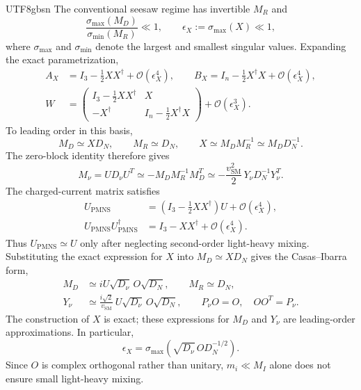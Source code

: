 \documentclass[11pt,a4paper,oneside]{report}
\begin{document}
\begin{CJK*}{UTF8}{gbsn}
The conventional seesaw regime has invertible $M_R$ and
\begin{equation*}
\frac{\sigma_{\max}(M_D)}{\sigma_{\min}(M_R)}\ll1,\qquad
\epsilon_X:=\sigma_{\max}(X)\ll1,
\tag{6.35}\label{eq:6.35}
\end{equation*}
where $\sigma_{\max}$ and $\sigma_{\min}$ denote the largest and smallest singular values. Expanding the exact parametrization,
\begin{equation*}
\begin{aligned}
A_X&=I_3-\frac12XX^\dagger+\mathcal O(\epsilon_X^4),\qquad
B_X=I_n-\frac12X^\dagger X+\mathcal O(\epsilon_X^4),\\
W&=\begin{pmatrix}I_3-\frac12XX^\dagger&X\\-X^\dagger&I_n-\frac12X^\dagger X\end{pmatrix}
+\mathcal O(\epsilon_X^3).
\end{aligned}
\tag{6.36}\label{eq:6.36}
\end{equation*}
To leading order in this basis,
\begin{equation*}
M_D\simeq XD_N,\qquad M_R\simeq D_N,\qquad
X\simeq M_DM_R^{-1}\simeq M_DD_N^{-1}.
\tag{6.37}\label{eq:6.37}
\end{equation*}
The zero-block identity therefore gives
\begin{equation*}
{\displaystyle M_\nu=UD_\nu U^T\simeq-M_DM_R^{-1}M_D^T
\simeq-\frac{v_{\mathrm{SM}}^2}{2}\,Y_\nu D_N^{-1}Y_\nu^T}.
\tag{6.38}\label{eq:6.38}
\end{equation*}
The charged-current matrix satisfies
\begin{equation*}
\begin{aligned}
U_{\mathrm{PMNS}}&=\left(I_3-\frac12XX^\dagger\right)U+\mathcal O(\epsilon_X^4),\\
U_{\mathrm{PMNS}}U_{\mathrm{PMNS}}^\dagger
&=I_3-XX^\dagger+\mathcal O(\epsilon_X^4).
\end{aligned}
\tag{6.39}\label{eq:6.39}
\end{equation*}
Thus $U_{\mathrm{PMNS}}\simeq U$ only after neglecting second-order light-heavy mixing. Substituting the exact expression for $X$ into $M_D\simeq XD_N$ gives the Casas–Ibarra form,
\begin{equation*}
{\displaystyle 
\begin{aligned}
M_D&\simeq iU\sqrt{D_\nu}\,O\sqrt{D_N},\qquad M_R\simeq D_N,\\
Y_\nu&\simeq\frac{i\sqrt2}{v_{\mathrm{SM}}}\,U\sqrt{D_\nu}\,O\sqrt{D_N},\qquad
P_\nu O=O,\quad OO^T=P_\nu.
\end{aligned}
}
\tag{6.40}\label{eq:6.40}
\end{equation*}
The construction of $X$ is exact; these expressions for $M_D$ and $Y_\nu$ are leading-order approximations. In particular,
\begin{equation*}
\epsilon_X=\sigma_{\max}\!\left(\sqrt{D_\nu}\,OD_N^{-1/2}\right).
\tag{6.41}\label{eq:6.41}
\end{equation*}
Since $O$ is complex orthogonal rather than unitary, $m_i\ll M_I$ alone does not ensure small light-heavy mixing.


\end{CJK*}
\end{document}

